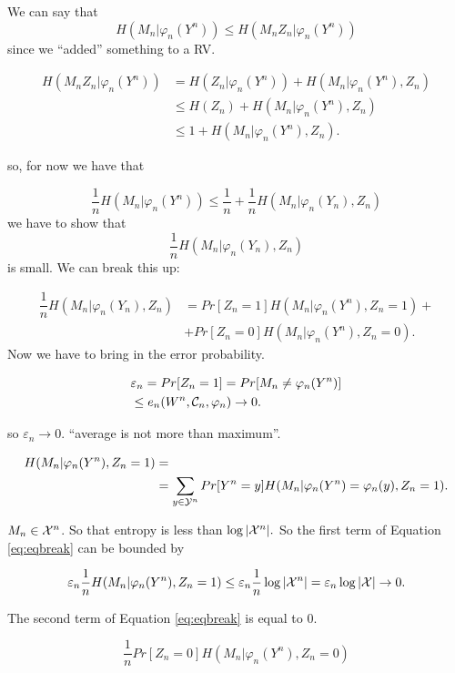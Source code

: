 We can say that
\[
 H(M_n|\varphi_n(Y^n)) \leq H(M_nZ_n | \varphi_n(Y^n))
\]
since we ``added'' something to a RV.

\begin{align*}
 H(M_nZ_n | \varphi_n(Y^n)) & = H(Z_n|\varphi_n(Y^n)) + H(M_n|\varphi_n(Y^n), Z_n)\\
 & \leq H(Z_n) + H(M_n|\varphi_n(Y^n), Z_n) \\
 & \leq 1+ H(M_n|\varphi_n(Y^n), Z_n).
\end{align*}

so, for now we have that

\[
 \dfrac{1}{n}H(M_n|\varphi_n(Y^n)) \leq \dfrac{1}{n} + \dfrac{1}{n}H(M_n|\varphi_n(Y_n), Z_n)
\]
we have to show that $$ \dfrac{1}{n}H(M_n|\varphi_n(Y_n), Z_n)$$ is small. We can break this up:

\begin{equation}\label{eq:eqbreak}
\begin{aligned}
 \dfrac{1}{n}H(M_n|\varphi_n(Y_n), Z_n) &= Pr[Z_n = 1]H(M_n|\varphi_n(Y^n), Z_n = 1) + \\
 &+ Pr[Z_n = 0]H(M_n|\varphi_n(Y^n), Z_n = 0).  
\end{aligned}
 \end{equation}
Now we have to bring in the error probability.

\begin{align*}
  & \varepsilon_n = Pr[Z_n = 1] = Pr[M_n \not=\varphi_n(Y^n)]\\
  & \leq e_n(W^n, \mathcal{C}_n, \varphi_n) \rightarrow 0.
\end{align*}

so $\varepsilon_n \rightarrow 0$. ``average is not more than maximum''.

\begin{align*}
 H(M_n | \varphi_n(Y^n), Z_n = 1) &= \\
 & =\sum_{y \in \mathcal{Y}^n} Pr[Y^n = y]H(M_n|\varphi_n(Y^n) = \varphi_n(y), Z_n = 1).
\end{align*}


$M_n \in \mathcal{X}^n$. So that entropy is less than $\log|\mathcal{X}^n|.$ So the first term of Equation \ref{eq:eqbreak} can be bounded by

\[
 \varepsilon_n \dfrac{1}{n}H(M_n|\varphi_n(Y^n), Z_n = 1) \leq \varepsilon_n \dfrac{1}{n} \log|\mathcal{X}^n| = \varepsilon_n \log|\mathcal{X}| \rightarrow 0.
\]

The second term of Equation \ref{eq:eqbreak} is equal to 0.

\[
 \dfrac{1}{n}Pr[Z_n = 0] H(M_n|\varphi_n(Y^n), Z_n = 0)
\]

